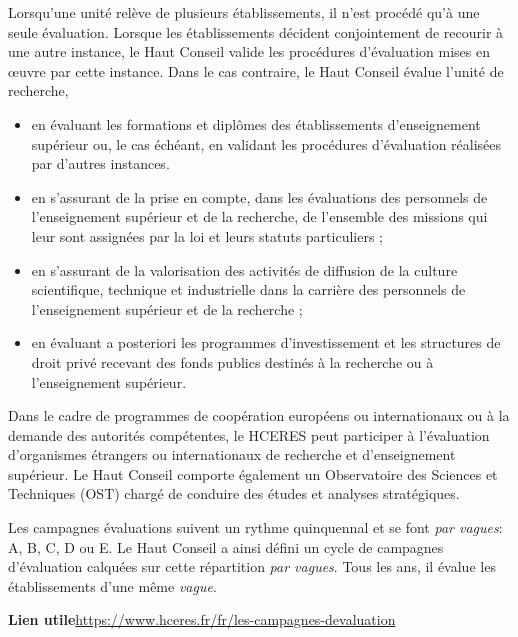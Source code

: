 Lorsqu'une unit\'e rel\`eve de plusieurs \'etablissements, il n'est proc\'ed\'e qu'\`a une seule \'evaluation. 
Lorsque les \'etablissements d\'ecident conjointement de recourir \`a une autre instance, le Haut Conseil valide les proc\'edures d'\'evaluation mises en \oe uvre par cette instance. Dans le cas contraire, le Haut Conseil \'evalue l'unit\'e de recherche,
\begin{itemize}
\item en \'evaluant les formations et dipl\^omes des \'etablissements d'enseignement sup\'erieur ou, le cas \'ech\'eant, 
en validant les proc\'edures d'\'evaluation r\'ealis\'ees par d'autres instances.
\item en s'assurant de la prise en compte, dans les \'evaluations des personnels de l'enseignement sup\'erieur et de la recherche, de l'ensemble des missions qui leur sont assign\'ees par la loi et leurs statuts particuliers ;
\item en s'assurant de la valorisation des activit\'es de diffusion de la culture scientifique, technique et industrielle dans la carri\`ere des personnels de l'enseignement sup\'erieur et de la recherche ;
\item en \'evaluant a posteriori les programmes d'investissement et les structures de droit priv\'e recevant des fonds publics destin\'es \`a la recherche ou \`a l'enseignement sup\'erieur. 
\end{itemize}
Dans le cadre de programmes de coop\'eration europ\'eens ou internationaux ou \`a la demande des autorit\'es comp\'etentes, le HCERES peut participer \`a l'\'evaluation d'organismes \'etrangers ou internationaux de recherche et d'enseignement sup\'erieur.
Le Haut Conseil comporte \'egalement un Observatoire des Sciences et Techniques (OST) charg\'e de conduire des \'etudes et analyses strat\'egiques. 

Les campagnes \'evaluations suivent un rythme quinquennal et se font \textit{par vagues}: A, B, C, D ou E.
Le Haut Conseil a ainsi d\'efini un cycle de campagnes d'\'evaluation calqu\'ees sur cette r\'epartition \textit{par vagues}.
Tous les ans, il \'evalue les \'etablissements d'une même \textit{vague}.

\textbf{Lien utile\hspace{.5em}}\url{https://www.hceres.fr/fr/les-campagnes-devaluation}


